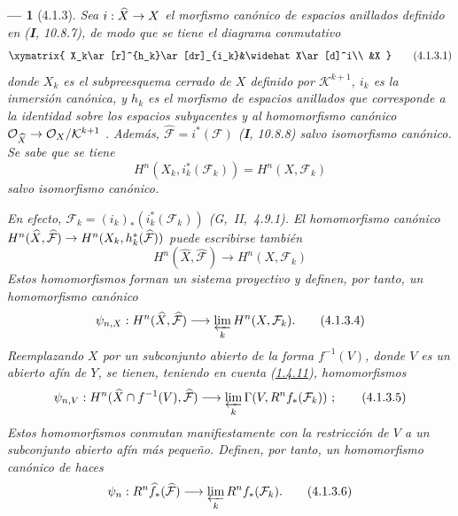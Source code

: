 \documentclass[10pt,oneside,openany]{book}
\theoremstyle{egaenv}\newtheorem*{env}{---}
\theoremstyle{egastatement}
\theoremstyle{egadescription}
\newcommand{\oldpage}[2][]{\marginnote{\normalfont\scriptsize\textbf{#1}\,|\,#2}\ignorespaces}
\renewcommand{\to}{\mathchoice{\longrightarrow}{\rightarrow}{\rightarrow}{\rightarrow}}
\begin{document}
\begin{env}[4.1.3]
\label{III.4.1.3}
\label{III.4.1.3-fr}
Sea $i:\widehat X\to X$ el morfismo canónico de espacios anillados definido en (\textbf{I}, 10.8.7), de modo que se tiene el diagrama conmutativo \[
\xymatrix{
X_k\ar[r]^{h_k}\ar[dr]_{i_k}&\widehat X\ar[d]^i\\
&X
}
\tag{4.1.3.1}\label{III.4.1.3.1-fr}
\]
donde $X_k$ es el subpreesquema cerrado de $X$ definido por
$\mathcal K^{k+1}$, $i_k$ es la inmersión canónica, y $h_k$ es el
morfismo de espacios anillados que corresponde a la identidad sobre
los espacios subyacentes y al homomorfismo canónico
$\mathcal O_{\widehat X}\to\mathcal O_X/\mathcal K^{k+1}$
.
Además,
$\widehat{\mathcal F}=i^*(\mathcal F)$ (\textbf{I}, 10.8.8) salvo isomorfismo canónico. Se sabe que se tiene \[
H^n(X_k,i_k^*(\mathcal F_k))=H^n(X,\mathcal F_k)
\tag{4.1.3.2}\label{III.4.1.3.2-fr}
\]
salvo isomorfismo canónico.

\oldpage[III]{124}

En efecto,
$\mathcal F_k=(i_k)_*(i_k^*(\mathcal F_k))$
(G,~II,~4.9.1).
El homomorfismo canónico
$H^n(\widehat X,\widehat{\mathcal F})\to
H^n(X_k,h_k^*(\widehat{\mathcal F}))$
 puede escribirse también
\[
H^n(\widehat X,\widehat{\mathcal F})\longrightarrow H^n(X,\mathcal F_k)
\tag{4.1.3.3}\label{III.4.1.3.3-fr}
\]
Estos homomorfismos forman un sistema proyectivo y definen, por tanto,
un homomorfismo canónico
\[
\psi_{n,X}:H^n(\widehat X,\widehat{\mathcal F})
\longrightarrow\varprojlim_kH^n(X,\mathcal F_k).
\tag{4.1.3.4}\label{III.4.1.3.4-fr}
\]
Reemplazando $X$ por un subconjunto abierto de la forma $f^{-1}(V)$,
donde $V$ es un abierto afín de $Y$, se tienen, teniendo en cuenta (\hyperref[III.1.4.11-fr]{1.4.11}), homomorfismos \[
\psi_{n,V}:H^n(\widehat X\cap f^{-1}(V),\widehat{\mathcal F})
\longrightarrow\varprojlim_k\Gamma(V,R^nf_*(\mathcal F_k))~;
\tag{4.1.3.5}\label{III.4.1.3.5-fr}
\]
Estos homomorfismos conmutan manifiestamente con la restricción de $V$
a un subconjunto abierto afín más pequeño.
Definen, por tanto, un \emph{homomorfismo canónico} de haces
\[
\psi_n:R^n\widehat f_*(\widehat{\mathcal F})
\longrightarrow\varprojlim_kR^nf_*(\mathcal F_k).
\tag{4.1.3.6}\label{III.4.1.3.6-fr}
\]
\end{env}
\end{document}
